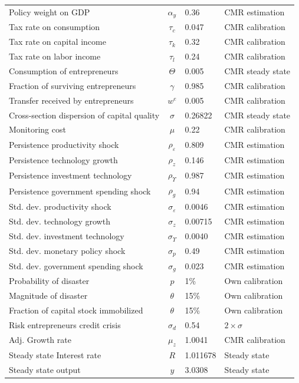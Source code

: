 \begin{table}[h!]
{{\begin{tabular}{lcll}
 Policy weight on GDP  	&	 $\alpha_{y}$  	&	0.36	&	CMR estimation	\\[3pt]
 Tax rate on consumption 	&	 $\tau_c$ 	&	0.047	&	CMR calibration 	\\
 Tax rate on capital income 	&	 $\tau_k$ 	&	0.32	&	CMR calibration 	\\
 Tax rate on labor income 	&	 $\tau_l$ 	&	0.24	&	CMR calibration 	\\[3pt]
 Consumption of entrepreneurs 	&	 $\Theta$ 	&	0.005	&	CMR steady state	\\
 Fraction of surviving entrepreneurs 	&	 $\gamma$ 	&	0.985	&	CMR calibration 	\\
 Transfer received by entrepreneurs	&	 $w^e$ 	&	0.005	&	CMR calibration 	\\
 Cross-section dispersion of capital quality 	&	 $\sigma$ 	&	0.26822	&	CMR steady state	\\
 Monitoring cost	&	 $\mu$ 	&	0.22	&	CMR calibration 	\\[3pt]
 Persistence productivity shock  	&	 $\rho_{\varepsilon}$  	&	0.809	&CMR estimation		\\
 Persistence technology growth  	&	 $\rho_{z}$ 	&	0.146	&	CMR estimation	\\
 Persistence investment technology 	&	 $\rho_{\Upsilon}$ 	&	0.987	&	CMR estimation	\\
 Persistence government spending shock 	&	 $\rho_{g}$ 	&	 0.94  	&	CMR estimation	\\[3pt]
 Std. dev.  productivity shock 	&	 $\sigma_{\varepsilon}$  	&	0.0046	&CMR estimation		\\
 Std. dev.  technology growth  	&	 $\sigma_{z}$  	&	0.00715	&	CMR estimation	\\
 Std. dev.  investment technology 	&	 $\sigma_{\Upsilon}$  	&	0.0040	&	CMR estimation	\\
 Std. dev. monetary policy shock    	&	 $\sigma_{p}$ 	&	 0.49 	&	CMR estimation	\\
 Std. dev. government spending shock 	&	 $\sigma_{g}$ 	&	 0.023  	&	CMR estimation	\\[3pt]
 Probability of disaster  	&	 $p$ 	&	 1\% 	&	Own calibration	\\
 Magnitude of disaster  	&	 $\theta$ 	&	 15\% 	&	Own calibration		\\
 Fraction of capital stock immobilized  	&	 $\theta$ 	&	 15\% 	&	Own calibration		\\
 Risk entrepreneurs credit crisis 	&	 $\sigma_d$ 	&	0.54	&	$2 \times \sigma $	 \\
 Adj. Growth rate 	&	 $\mu_z$ 	&	1.0041	&	CMR calibration	 \\
 Steady state Interest rate  	&	 $R$ 	&	1.011678	&	Steady state	 \\
Steady state output	&	 $y$ 	&	3.0308	&	Steady state	 \\
 \bottomrule
\end{tabular}
}}
\end{table}



